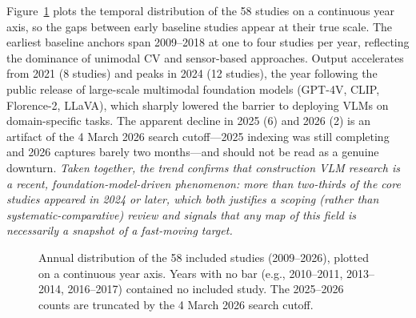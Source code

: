 \documentclass[10pt,letterpaper]{article}
\begin{document}
Figure~\ref{fig:pubyear} plots the temporal distribution of the 58 studies on a continuous year axis, so the gaps between early baseline studies appear at their true scale. The earliest baseline anchors span 2009--2018 at one to four studies per year, reflecting the dominance of unimodal CV and sensor-based approaches. Output accelerates from 2021 (8 studies) and peaks in 2024 (12 studies), the year following the public release of large-scale multimodal foundation models (GPT-4V, CLIP, Florence-2, LLaVA), which sharply lowered the barrier to deploying VLMs on domain-specific tasks. The apparent decline in 2025 (6) and 2026 (2) is an artifact of the 4 March 2026 search cutoff---2025 indexing was still completing and 2026 captures barely two months---and should not be read as a genuine downturn. \textit{Taken together, the trend confirms that construction VLM research is a recent, foundation-model-driven phenomenon: more than two-thirds of the core studies appeared in 2024 or later, which both justifies a scoping (rather than systematic-comparative) review and signals that any map of this field is necessarily a snapshot of a fast-moving target.}

\begin{figure}[H]
\caption{Annual distribution of the 58 included studies (2009--2026), plotted on a continuous year axis. Years with no bar (e.g., 2010--2011, 2013--2014, 2016--2017) contained no included study. The 2025--2026 counts are truncated by the 4 March 2026 search cutoff.}
\label{fig:pubyear}
\centering
{}
\end{figure}
\end{document}
